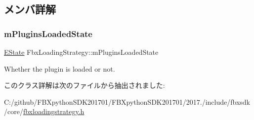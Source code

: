 \subsection{メンバ詳解}
\mbox{\label{class_fbx_loading_strategy_a7ae53371abecd1686cd765d19697e1c8}} 
\subsubsection{\texorpdfstring{m\+Plugins\+Loaded\+State}{mPluginsLoadedState}}
{\footnotesize\ttfamily \hyperlink{class_fbx_loading_strategy_a2f61523e78f4bb06d46ccf3351d2bcdb}{E\+State} Fbx\+Loading\+Strategy\+::m\+Plugins\+Loaded\+State\hspace{0.3cm}{\ttfamily [protected]}}



Whether the plugin is loaded or not. 



このクラス詳解は次のファイルから抽出されました\+:\begin{DoxyCompactItemize}
\item 
C\+:/github/\+F\+B\+Xpython\+S\+D\+K201701/\+F\+B\+Xpython\+S\+D\+K201701/2017./include/fbxsdk/core/\hyperlink{fbxloadingstrategy_8h}{fbxloadingstrategy.\+h}\end{DoxyCompactItemize}
